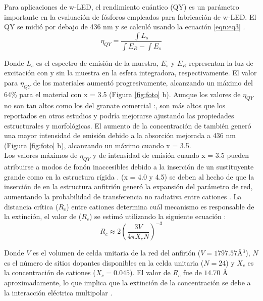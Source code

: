 Para aplicaciones de w-LED, el rendimiento cuántico (QY) es un parámetro
importante en la evaluación de fósforos empleados para fabricación de w-LED. El
QY se midió por debajo de 436 nm y se calculó usando la ecuación
\ref{eqn:eq3} \cite{Liu2013}.\\

\begin{equation}
    \eta_{QY} =\frac{\int L_s}{\int E_R-\int E_s}
    \label{eqn:eq3}
\end{equation}

Donde $L_s$ es el espectro de emisión de la muestra, $E_s$ y $E_R$ representan
la luz de excitación con y sin la muestra en la esfera integradora,
respectivamente. El
valor para $\eta_{QY}$ de los materiales aumentó progresivamente, alcanzando un
máximo del 64\% para el material con x = 3.5 (Figura \ref{fig:foto} b). Aunque los valores
de
$\eta_{QY}$ no son tan altos como los del granate comercial
:,
son más altos que los reportados en otros estudios y podría mejorarse ajustando
las
propiedades estructurales y morfológicas. El aumento de la concentración de
 también generó una mayor intensidad de emisión debido a la
absorción
mejorada a 436 nm (Figura \ref{fig:foto} b), alcanzando un máximo cuando x =
3.5.\\

Los valores máximos de $\eta_{QY}$ y de intensidad de emisión cuando x = 3.5
pueden atribuirse a modos de fonón inaccesibles debido a la inserción de un
sustituyente grande como  en la estructura rígida
\cite{George2013}. (x = 4.0 y
4.5) se deben al hecho de que la inserción de  en la estructura
anfitrión generó la expansión del parámetro de red, aumentando la probabilidad
de transferencia
no radiativa entre cationes  \cite{Chen2015a}. La distancia crítica
($R_c$)
entre cationes  determina cuál mecanismo es responsable de la
extinción, el valor
de ($R_c$) se estimó utilizando la siguiente ecuación \cite{Blasse1968}:\\

\begin{equation}
    R_c \approx 2\left(\frac{3V}{4 \pi X_c N}\right)^{-3}
    \label{eqn:eq4}
\end{equation}

Donde $V$ es el volumen de celda unitaria de la red del anfirión
($V=1797.57$\r{A}$^3$), $N$ es el número de sitios dopantes disponibles en la
celda
unitaria ($N=24$) y $X_c$ es la concentración de cationes 
($X_c=0.045$). El
valor de $R_c$ fue de $14.70$ \r{A} aproximadamente, lo que implica que la
extinción de la
concentración se debe a la interacción eléctrica multipolar
\cite{Li2018,Hua2016}.\\

